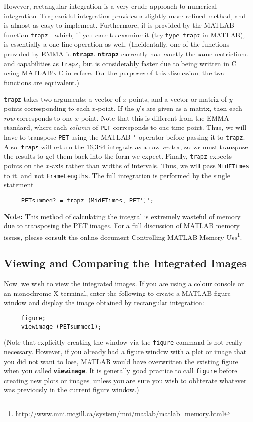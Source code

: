 \documentclass[11pt]{article}
\def\code#1{{\tt \bf #1}}
\begin{document}
However, rectangular integration is a very crude approach to
numerical integration.  Trapezoidal integration provides a slightly
more refined method, and is almost as easy to implement.
Furthermore, it is provided by the MATLAB function
\verb|trapz|---which, if you care to examine it (try 
\verb|type trapz| in MATLAB), is essentially a one-line operation as well.
(Incidentally, one of the functions provided by EMMA is
\code{ntrapz}.  \code{ntrapz} currently has exactly the same
restrictions and capabilities as \verb|trapz|, but is considerably
faster due to being written in C using MATLAB's C interface.  For the
purposes of this discussion, the two functions are equivalent.)

\verb|trapz| takes two arguments: a vector of $x$-points, and a vector
or matrix of $y$ points corresponding to each $x$-point.  If the $y$'s
are given as a matrix, then each {\em row} corresponds to one $x$
point.  Note that this is different from the EMMA standard, where each
{\em column} of \verb|PET| corresponds to one time point.  Thus, we
will have to transpose \verb|PET| using the MATLAB \verb|'| operator
before passing it to \verb|trapz|.  Also, \verb|trapz| will return the
16,384 integrals as a row vector, so we must transpose the results to
get them back into the form we expect.  Finally, \verb|trapz| expects
points on the $x$-axis rather than widths of intervals.  Thus, we will
pass \verb|MidFTimes| to it, and not \verb|FrameLengths|.  The full
integration is performed by the single statement
\begin{verbatim}
     PETsummed2 = trapz (MidFTimes, PET')';
\end{verbatim}

{\bf Note:} This method of calculating the integral is
extremely wasteful of memory due to transposing the PET images.  For a
full discussion of MATLAB memory issues, please consult the online
document Controlling MATLAB Memory
Use\footnote{http://www.mni.mcgill.ca/system/mni/matlab/matlab\_memory.html}.



\subsection{Viewing and Comparing the Integrated Images}

Now, we wish to view the integrated images.  If you are using a colour
console or an monochrome X terminal, enter the following to create a
MATLAB figure window and display the image obtained by rectangular
integration:
\begin{verbatim}
     figure;
     viewimage (PETsummed1);
\end{verbatim}
(Note that explicitly creating the window via the \verb|figure|
command is not really necessary.  However, if you already had a
figure window with a plot or image that you did not want to lose,
MATLAB would have overwritten the existing figure when you called
\code{viewimage}.  It is generally good practice to call
\verb|figure| before creating new plots or images, unless you are
sure you wish to obliterate whatever was previously in the current
figure window.)
\end{document}
